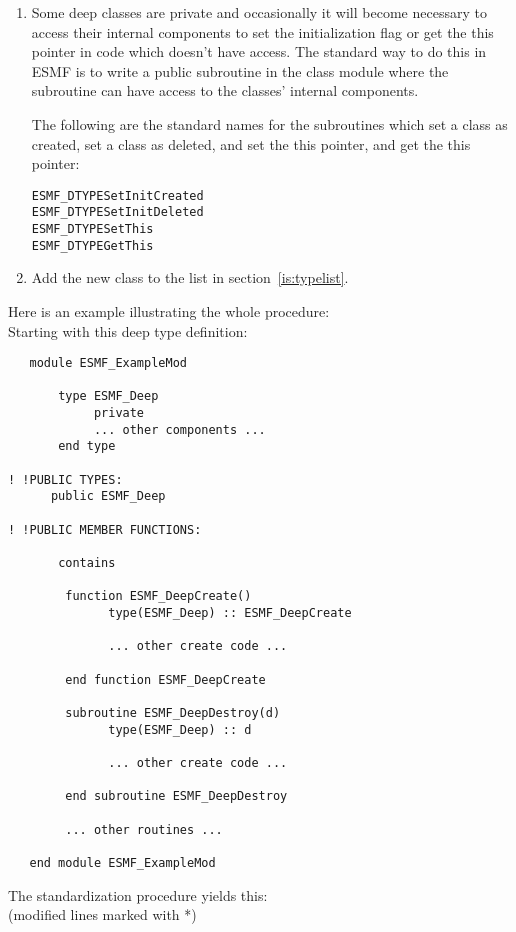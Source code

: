 \begin{enumerate}
\item  Some deep classes are private and occasionally it
will become necessary to access their internal components
to set the initialization flag or get the this pointer
in code which doesn't have access. The standard way
to do this in ESMF is to write a public subroutine in the 
class module where the subroutine can have access to 
the classes' internal components.

 The following are the standard names for the subroutines
which set a class as created, set a class as deleted, and set the this 
pointer, and get the this pointer:
\begin{verbatim}
ESMF_DTYPESetInitCreated
ESMF_DTYPESetInitDeleted
ESMF_DTYPESetThis
ESMF_DTYPEGetThis
\end{verbatim}


\item Add the new class to the list in section~\ref{is:typelist}.

\end{enumerate}

    
Here is an example illustrating the whole procedure: \\

Starting with this deep type definition:

\begin{verbatim}
   module ESMF_ExampleMod

       type ESMF_Deep
            private
            ... other components ...
       end type

! !PUBLIC TYPES:
      public ESMF_Deep

! !PUBLIC MEMBER FUNCTIONS:

       contains

        function ESMF_DeepCreate()
              type(ESMF_Deep) :: ESMF_DeepCreate

              ... other create code ...

        end function ESMF_DeepCreate

        subroutine ESMF_DeepDestroy(d)
              type(ESMF_Deep) :: d

              ... other create code ...

        end subroutine ESMF_DeepDestroy

        ... other routines ...

   end module ESMF_ExampleMod
\end{verbatim}

The standardization procedure yields this:\\
(modified lines marked with *)

